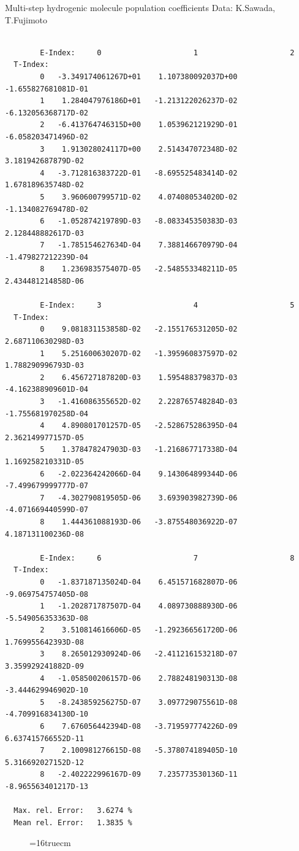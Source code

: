 \documentclass[12pt,dvips]{article}
\begin{document}
 Multi-step hydrogenic molecule population coefficients
 Data: K.Sawada, T.Fujimoto
\begin{small}\begin{verbatim}

        E-Index:     0                     1                     2
  T-Index:
        0   -3.349174061267D+01    1.107380092037D+00   -1.655827681081D-01
        1    1.284047976186D+01   -1.213122026237D-02   -6.132056368717D-02
        2   -6.413764746315D+00    1.053962121929D-01   -6.058203471496D-02
        3    1.913028024117D+00    2.514347072348D-02    3.181942687879D-02
        4   -3.712816383722D-01   -8.695525483414D-02    1.678189635748D-02
        5    3.960600799571D-02    4.074080534020D-02   -1.134082769478D-02
        6   -1.052874219789D-03   -8.083345350383D-03    2.128448882617D-03
        7   -1.785154627634D-04    7.388146670979D-04   -1.479827212239D-04
        8    1.236983575407D-05   -2.548553348211D-05    2.434481214858D-06

        E-Index:     3                     4                     5
  T-Index:
        0    9.081831153858D-02   -2.155176531205D-02    2.687110630298D-03
        1    5.251600630207D-02   -1.395960837597D-02    1.788290996793D-03
        2    6.456727187820D-03    1.595488379837D-03   -4.162388909601D-04
        3   -1.416086355652D-02    2.228765748284D-03   -1.755681970258D-04
        4    4.890801701257D-05   -2.528675286395D-04    2.362149977157D-05
        5    1.378478247903D-03   -1.216867717338D-04    1.169258210331D-05
        6   -2.022364242066D-04    9.143064899344D-06   -7.499679999777D-07
        7   -4.302790819505D-06    3.693903982739D-06   -4.071669440599D-07
        8    1.444361088193D-06   -3.875548036922D-07    4.187131100236D-08

        E-Index:     6                     7                     8
  T-Index:
        0   -1.837187135024D-04    6.451571682807D-06   -9.069754757405D-08
        1   -1.202871787507D-04    4.089730888930D-06   -5.549056353363D-08
        2    3.510814616606D-05   -1.292366561720D-06    1.769955642393D-08
        3    8.265012930924D-06   -2.411216153218D-07    3.359929241882D-09
        4   -1.058500206157D-06    2.788248190313D-08   -3.444629946902D-10
        5   -8.243859256275D-07    3.097729075561D-08   -4.709916834130D-10
        6    7.676056442394D-08   -3.719597774226D-09    6.637415766552D-11
        7    2.100981276615D-08   -5.378074189405D-10    5.316692027152D-12
        8   -2.402222996167D-09    7.235773530136D-11   -8.965563401217D-13

  Max. rel. Error:   3.6274 %
  Mean rel. Error:   1.3835 %

\end{verbatim}\end{small}
\begin{figure} \label{2.2.5fu}
\epsfxsize=16truecm
\end{figure}
\end{document}
